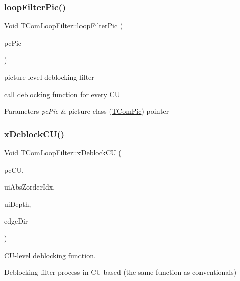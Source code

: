 \subsubsection{\texorpdfstring{loop\+Filter\+Pic()}{loopFilterPic()}}
{\footnotesize\ttfamily Void T\+Com\+Loop\+Filter\+::loop\+Filter\+Pic (\begin{DoxyParamCaption}\item[{\hyperlink{class_t_com_pic}{T\+Com\+Pic} $\ast$}]{pc\+Pic }\end{DoxyParamCaption})}



picture-\/level deblocking filter 


\begin{DoxyItemize}
\item call deblocking function for every CU
\end{DoxyItemize}
\begin{DoxyParams}{Parameters}
{\em pc\+Pic} & picture class (\hyperlink{class_t_com_pic}{T\+Com\+Pic}) pointer \\
\hline
\end{DoxyParams}
\mbox{\label{class_t_com_loop_filter_a15915a5d41a74e4194af29f770b99a3d}} 
\subsubsection{\texorpdfstring{x\+Deblock\+C\+U()}{xDeblockCU()}}
{\footnotesize\ttfamily Void T\+Com\+Loop\+Filter\+::x\+Deblock\+CU (\begin{DoxyParamCaption}\item[{\hyperlink{class_t_com_data_c_u}{T\+Com\+Data\+CU} $\ast$}]{pc\+CU,  }\item[{U\+Int}]{ui\+Abs\+Zorder\+Idx,  }\item[{U\+Int}]{ui\+Depth,  }\item[{Deblock\+Edge\+Dir}]{edge\+Dir }\end{DoxyParamCaption})\hspace{0.3cm}{\ttfamily [protected]}}



C\+U-\/level deblocking function. 

Deblocking filter process in C\+U-\/based (the same function as conventional\textquotesingle{}s)


